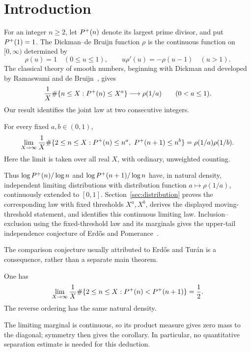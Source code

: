 \section{Introduction}\label{sec:introduction}

For an integer $n\geq2$, let $P^+(n)$ denote its largest prime divisor,
and put $P^+(1)=1$.  The Dickman--de Bruijn function $\rho$ is the
continuous function on $[0,\infty)$ determined by
\[
 \rho(u)=1\quad(0\leq u\leq1),\qquad
 u\rho'(u)=-\rho(u-1)\quad(u>1).
\]
The classical theory of smooth
numbers, beginning with Dickman and developed by Ramaswami and
de Bruijn~\cite{Dickman1930,Ramaswami1949,deBruijn1951}, gives
\[
 \frac1X\#\{n\leq X:P^+(n)\leq X^a\}
 \longrightarrow \rho(1/a)\qquad(0<a\leq1).
\]
Our result identifies the joint law at two consecutive integers.

\begin{theorem}\label{thm:main}
For every fixed $a,b\in(0,1)$,
\[
 \lim_{X\to\infty}\frac1X
 \#\{2\leq n\leq X:P^+(n)\leq n^a,
                         \ P^+(n+1)\leq n^b\}
 =\rho(1/a)\rho(1/b).
\]
Here the limit is taken over all real $X$, with ordinary, unweighted
counting.
\end{theorem}

Thus $\log P^+(n)/\log n$ and $\log P^+(n+1)/\log n$ have, in natural
density, independent limiting distributions with distribution function
$a\mapsto\rho(1/a)$, continuously extended to $[0,1]$.
Section~\ref{sec:distribution} proves the corresponding law with fixed
thresholds $X^a,X^b$, derives the displayed moving-threshold statement,
and identifies this continuous limiting law.  Inclusion--exclusion using
the fixed-threshold law and its marginals gives the upper-tail independence conjecture of
Erd\H{o}s and Pomerance~\cite[p.~311]{ErdosPomerance1978}.

The comparison conjecture usually attributed to Erd\H{o}s and Tur\'an is
a consequence, rather than a separate main theorem.

\begin{corollary}\label{cor:comparison}
One has
\[
 \lim_{X\to\infty}\frac1X
 \#\{2\leq n\leq X:P^+(n)<P^+(n+1)\}=\frac12.
\]
The reverse ordering has the same natural density.
\end{corollary}

The limiting marginal is continuous, so its product measure gives zero
mass to the diagonal; symmetry then gives the corollary.  In particular,
no quantitative separation estimate is needed for this deduction.

